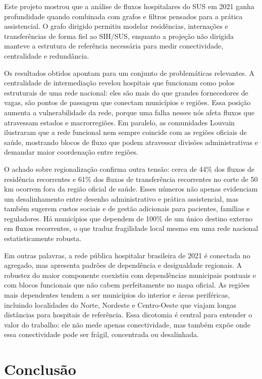 \documentclass[10pt,a4paper]{article}
\begin{document}
Este projeto mostrou que a análise de fluxos hospitalares do SUS em 2021 ganha profundidade quando combinada com grafos e filtros pensados para a prática assistencial. O grafo dirigido permitiu modelar residências, internações e transferências de forma fiel ao SIH/SUS, enquanto a projeção não dirigida manteve a estrutura de referência necessária para medir conectividade, centralidade e redundância.

Os resultados obtidos apontam para um conjunto de problemáticas relevantes. A centralidade de intermediação revelou hospitais que funcionam como polos estruturais de uma rede nacional: eles são mais do que grandes fornecedores de vagas, são pontos de passagem que conectam municípios e regiões. Essa posição aumenta a vulnerabilidade da rede, porque uma falha nesses nós afeta fluxos que atravessam estados e macrorregiões. Em paralelo, as comunidades Louvain ilustraram que a rede funcional nem sempre coincide com as regiões oficiais de saúde, mostrando blocos de fluxo que podem atravessar divisões administrativas e demandar maior coordenação entre regiões.

O achado sobre regionalização confirma outra tensão: cerca de 44\% dos fluxos de residência recorrentes e 61\% dos fluxos de transferência recorrentes no corte de 50 km ocorrem fora da região oficial de saúde. Esses números não apenas evidenciam um desalinhamento entre desenho administrativo e prática assistencial, mas também sugerem custos sociais e de gestão adicionais para pacientes, famílias e reguladores. Há municípios que dependem de 100\% de um único destino externo em fluxos recorrentes, o que traduz fragilidade local mesmo em uma rede nacional estatisticamente robusta.

Em outras palavras, a rede pública hospitalar brasileira de 2021 é conectada no agregado, mas apresenta padrões de dependência e desigualdade regionais. A robustez do maior componente coexistiu com dependências municipais pontuais e com blocos funcionais que não cabem perfeitamente no mapa oficial. As regiões mais dependentes tendem a ser municípios do interior e áreas periféricas, incluindo localidades do Norte, Nordeste e Centro-Oeste que viajam longas distâncias para hospitais de referência. Essa dicotomia é central para entender o valor do trabalho: ele não mede apenas conectividade, mas também expõe onde essa conectividade pode ser frágil, concentrada ou desalinhada.

\section{Conclusão}
\end{document}
